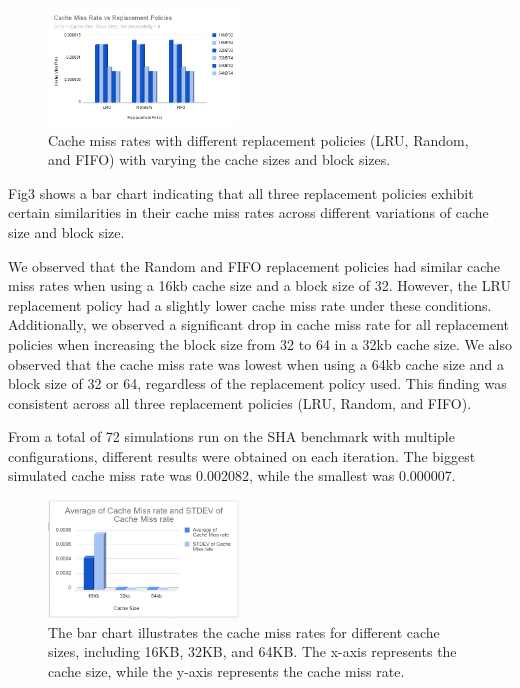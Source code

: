 \documentclass[conference]{IEEEtran}
\begin{document}
\begin{figure}[H]
    \centering
    \includegraphics[width=0.45\textwidth]{sha/sha_cache_vs_repl8.png}
    \caption{Cache miss rates with different replacement policies (LRU, Random, and FIFO) with varying the cache sizes and block sizes.}
\end{figure}

Fig3 shows a bar chart indicating that all three replacement policies exhibit certain similarities in their cache miss rates across different variations of cache size and block size.


We observed that the Random and FIFO replacement policies had similar cache miss rates when using a 16kb cache size and a block size of 32. However, the LRU replacement policy had a slightly lower cache miss rate under these conditions. Additionally, we observed a significant drop in cache miss rate for all replacement policies when increasing the block size from 32 to 64 in a 32kb cache size. We also observed that the cache miss rate was lowest when using a 64kb cache size and a block size of 32 or 64, regardless of the replacement policy used. This finding was consistent across all three replacement policies (LRU, Random, and FIFO).


From a total of 72 simulations run on the SHA benchmark with multiple configurations, different results were obtained on each iteration. The biggest simulated cache miss rate was 0.002082, while the smallest was 0.000007.

\begin{figure}[H]
    \centering
    \includegraphics[width=0.45\textwidth]{sha/sha_avg_cachesize.png}
    \caption{The bar chart illustrates the cache miss rates for different cache sizes, including 16KB, 32KB, and 64KB. The x-axis represents the cache size, while the y-axis represents the cache miss rate.}
\end{figure}
\end{document}
